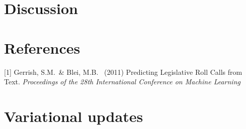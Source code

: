 \documentclass{article}
\begin{document}
\section{Discussion}




\section*{References}

\medskip

\small

[1] Gerrish, S.M.\ \& Blei, M.B. \ (2011) Predicting Legislative Roll Calls from Text. {\it Proceedings of the 28th International Conference on Machine Learning}

\appendix

\section{Variational updates}
\end{document}
